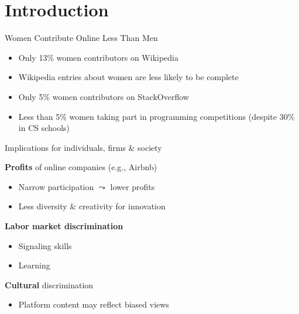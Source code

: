 \section{Introduction}\label{introduction}

\begin{frame}{Women Contribute Online Less Than Men}

\begin{itemize}[<+->]
\tightlist
\item
  Only 13\% women contributors on Wikipedia
\item
  Wikipedia entries about women are less likely to be complete
\item
  Only 5\% women contributors on StackOverflow
\item
  Less than 5\% women taking part in programming competitions (despite
  30\% in CS schools)
\end{itemize}

\end{frame}

\begin{frame}{Implications for individuals, firms \& society}

\textbf{Profits} of online companies (e.g., Airbnb)

\begin{itemize}
\tightlist
\item
  Narrow participation \(\leadsto\) lower profits
\item
  Less diversity \& creativity for innovation
\end{itemize}

\pause

\textbf{Labor market discrimination}

\begin{itemize}
\tightlist
\item
  Signaling skills
\item
  Learning
\end{itemize}

\pause

\textbf{Cultural} discrimination

\begin{itemize}
\tightlist
\item
  Platform content may reflect biased views
\end{itemize}

\end{frame}

